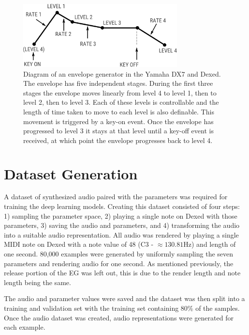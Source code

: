 \begin{figure}[ht]
    \centering
    \includegraphics[width=0.75\textwidth]{figures/spiegelib/Yamaha DX7 Envelope.png}
    \caption{Diagram of an envelope generator in the Yamaha DX7 and Dexed. The envelope has five independent stages. During the first three stages the envelope moves linearly from level 4 to level 1, then to level 2, then to level 3. Each of these levels is controllable and the length of time taken to move to each level is also definable. This movement is triggered by a key-on event. Once the envelope has progressed to level 3 it stays at that level until a key-off event is received, at which point the envelope progresses back to level 4.}
    \label{fig:dx7_envelope}
\end{figure}


\section{Dataset Generation}
\label{sec:dataset-generation}

A dataset of synthesized audio paired with the parameters was required for training the deep learning models. Creating this dataset consisted of four steps: 1) sampling the parameter space, 2) playing a single note on Dexed with those parameters, 3) saving the audio and parameters, and 4) transforming the audio into a suitable audio representation. All audio was rendered by playing a single MIDI note on Dexed with a note value of 48 (C3 - $\approx 130.81$Hz) and length of one second. 80,000 examples were generated by uniformly sampling the seven parameters and rendering audio for one second. As mentioned previously, the release portion of the EG was left out, this is due to the render length and note length being the same.

The audio and parameter values were saved and the dataset was then split into a training and validation set with the training set containing 80\% of the samples. Once the audio dataset was created, audio representations were generated for each example.

